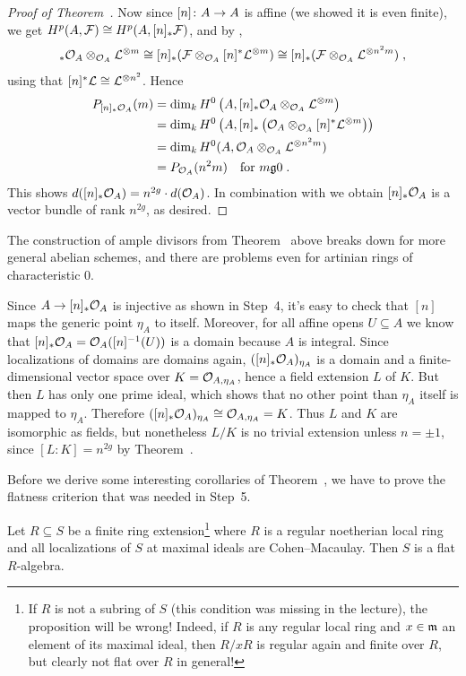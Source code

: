 \documentclass[a4paper,parskip=half,numbers=enddot, DIV=12]{scrreprt}
\begin{document}
\begin{proof}[Proof of Theorem~]
	Now since $[n]\colon A\morphism A$ is affine (we showed it is even finite), we get $H^p(A,\mathcal{F})\cong H^p(A,[n]_*\mathcal{F})$, and by \cite[Remark~2.2.7]{alggeo2},
	\begin{align*}
		[n]_*\Oo_A\otimes_{\Oo_A}\Ll^{\otimes m}\cong[n]_*(\Ff\otimes_{\Oo_A}[n]^*\Ll^{\otimes m})\cong  [n]_*(\Ff\otimes_{\Oo_A}\Ll^{\otimes n^2m})\;,
	\end{align*}
	 using that $[n]^*\mathcal{L}\cong \mathcal{L}^{\otimes n^2}$. Hence
	\begin{align*}
		P_{[n]_*\Oo_A}(m)&=\dim_kH^0\left(A,[n]_*\Oo_A\otimes_{\Oo_A}\Ll^{\otimes m}\right)\\
		&=\dim_kH^0\left(A,[n]_*\left(\Oo_A\otimes_{\Oo_A}[n]^*\Ll^{\otimes m}\right)\right)\\
		&=\dim_kH^0(A,\Oo_A\otimes_{\Oo_A}\Ll^{\otimes n^2m})\\
		&=P_{\Oo_A}(n^2m)\quad\text{for }m\gge 0\;.
	\end{align*}
	This shows $d([n]_*\mathcal{O}_A)=n^{2g}\cdot d(\mathcal{O}_A)$. In combination with  we obtain $[n]_*\mathcal{O}_A$ is a vector bundle of rank $n^{2g}$, as desired.
\end{proof}
\begin{rem}
	The construction of ample divisors from Theorem~ above breaks down for more general abelian schemes, and there are problems even for artinian rings of characteristic $0$.
\end{rem}
\begin{rem}
	Since $A\morphism[][n]_*\Oo_A$ is injective as shown in Step~4, it's easy to check that $[n]$ maps the generic point $\eta_A$ to itself. Moreover, for all affine opens $U\subseteq A$ we know that $[n]_*\mathcal{O}_A=\mathcal{O}_A([n]^{-1}(U))$ is a domain because $A$ is integral. Since localizations of domains are domains again, $([n]_*\mathcal{O}_A)_{\eta_A}$ is a domain and a finite-dimensional vector space over $K=\mathcal{O}_{A,\eta_A}$, hence a field extension $L$ of $K$. But then $L$ has only one prime ideal, which shows that no other point than $\eta_A$ itself is mapped to $\eta_A$. Therefore $([n]_*\mathcal{O}_A)_{\eta_A}\cong \mathcal{O}_{A,\eta_A}=K$. Thus $L$ and $K$ are isomorphic as fields, but nonetheless $L/K$ is no trivial extension unless $n=\pm 1$, since $[L:K]=n^{2g}$ by Theorem~.
\end{rem}
Before we derive some interesting corollaries of Theorem~, we have to prove the flatness criterion that was needed in Step~5.
\begin{prop}
Let $R\subseteq S$ be a finite ring extension\footnote{If $R$ is not a subring of $S$ (this condition was missing in the lecture), the proposition will be wrong! Indeed, if $R$ is any regular local ring and $x\in \mathfrak{m}$ an element of its maximal ideal, then $R/xR$ is regular again and finite over $R$, but clearly not flat over $R$ in general!} where $R$ is a  regular noetherian local ring and all localizations of $S$ at maximal ideals are Cohen--Macaulay. Then $S$ is a flat $R$-algebra.
\end{prop}
\end{document}
